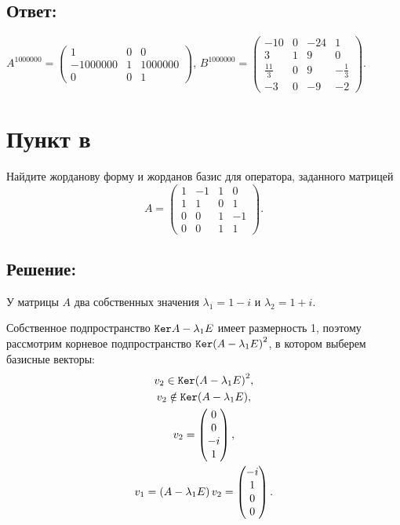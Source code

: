 \documentclass[12pt]{article}
\begin{document}
    \subsection*{Ответ:}
    $
    A^{1000000}
    = \begin{pmatrix}
          1        & 0 & 0       \\
          -1000000 & 1 & 1000000 \\
          0        & 0 & 1
    \end{pmatrix}
    $,
    $
    B^{1000000}
    = \begin{pmatrix}
          -10          & 0 & -24 & 1             \\
          3            & 1 & 9   & 0             \\
          \frac{11}{3} & 0 & 9   & - \frac{1}{3} \\
          -3           & 0 & -9  & -2
    \end{pmatrix}
    $.

    \section*{Пункт в}
    Найдите жорданову форму и жорданов базис для оператора, заданного матрицей
    \[
        A = \begin{pmatrix}
                1 & -1 & 1 & 0  \\
                1 & 1  & 0 & 1  \\
                0 & 0  & 1 & -1 \\
                0 & 0  & 1 & 1
        \end{pmatrix} .
    \]

    \subsection*{Решение:}
    У матрицы $A$ два собственных значения $\lambda_1 = 1 - i$ и $\lambda_2 = 1 + i$.

    Собственное подпространство $\mathtt{Ker}{A - \lambda_1 E}$ имеет размерность 1, поэтому рассмотрим корневое подпространство $\mathtt{Ker}{\left ( A - \lambda_1 E \right )^2}$,
    в котором выберем базисные векторы:
    \begin{gather*}
        v_2 \in \mathtt{Ker}{\left ( A - \lambda_1 E \right)^2}, \\
        v_2 \notin \mathtt{Ker}{\left ( A - \lambda_1 E \right)}, \\
        v_2 = \begin{pmatrix}
                  0 \\ 0 \\ -i \\ 1
        \end{pmatrix}, \\
        v_1
        = \left ( A - \lambda_1 E \right) v_2
        = \begin{pmatrix}
              -i \\ 1 \\ 0 \\ 0
        \end{pmatrix}.
    \end{gather*}
\end{document}
